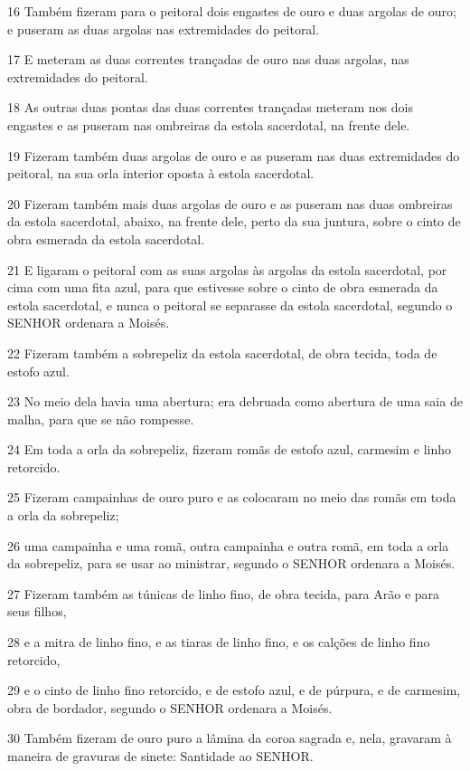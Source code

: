 \par 16 Também fizeram para o peitoral dois engastes de ouro e duas argolas de ouro; e puseram as duas argolas nas extremidades do peitoral.
\par 17 E meteram as duas correntes trançadas de ouro nas duas argolas, nas extremidades do peitoral.
\par 18 As outras duas pontas das duas correntes trançadas meteram nos dois engastes e as puseram nas ombreiras da estola sacerdotal, na frente dele.
\par 19 Fizeram também duas argolas de ouro e as puseram nas duas extremidades do peitoral, na sua orla interior oposta à estola sacerdotal.
\par 20 Fizeram também mais duas argolas de ouro e as puseram nas duas ombreiras da estola sacerdotal, abaixo, na frente dele, perto da sua juntura, sobre o cinto de obra esmerada da estola sacerdotal.
\par 21 E ligaram o peitoral com as suas argolas às argolas da estola sacerdotal, por cima com uma fita azul, para que estivesse sobre o cinto de obra esmerada da estola sacerdotal, e nunca o peitoral se separasse da estola sacerdotal, segundo o SENHOR ordenara a Moisés.
\par 22 Fizeram também a sobrepeliz da estola sacerdotal, de obra tecida, toda de estofo azul.
\par 23 No meio dela havia uma abertura; era debruada como abertura de uma saia de malha, para que se não rompesse.
\par 24 Em toda a orla da sobrepeliz, fizeram romãs de estofo azul, carmesim e linho retorcido.
\par 25 Fizeram campainhas de ouro puro e as colocaram no meio das romãs em toda a orla da sobrepeliz;
\par 26 uma campainha e uma romã, outra campainha e outra romã, em toda a orla da sobrepeliz, para se usar ao ministrar, segundo o SENHOR ordenara a Moisés.
\par 27 Fizeram também as túnicas de linho fino, de obra tecida, para Arão e para seus filhos,
\par 28 e a mitra de linho fino, e as tiaras de linho fino, e os calções de linho fino retorcido,
\par 29 e o cinto de linho fino retorcido, e de estofo azul, e de púrpura, e de carmesim, obra de bordador, segundo o SENHOR ordenara a Moisés.
\par 30 Também fizeram de ouro puro a lâmina da coroa sagrada e, nela, gravaram à maneira de gravuras de sinete: Santidade ao SENHOR.

